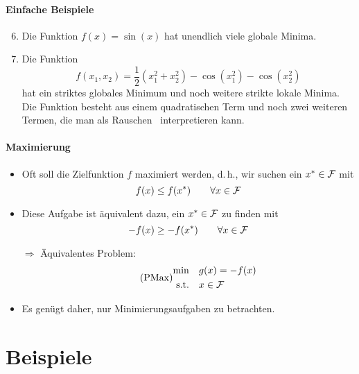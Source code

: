 \paragraph{Einfache Beispiele}

\begin{enumerate}[label=\emph{\alph*})]
	\setcounter{enumi}{5}
	\item Die Funktion $f(x)=\sin(x)$ hat unendlich viele globale Minima.
	\item  Die Funktion
		\begin{equation*}
			f(x_1,x_2)=\frac{1}{2}(x_1^2+x_2^2)-\cos(x_1^2)-\cos(x_2^2)
		\end{equation*}
		hat ein striktes globales Minimum und noch weitere strikte lokale Minima. Die Funktion besteht aus einem quadratischen Term und noch zwei weiteren Termen, die man als \glqq Rauschen\grqq ~ interpretieren kann.
\end{enumerate}

\paragraph{Maximierung}

\begin{itemize}
	\item Oft soll die Zielfunktion $f$ maximiert werden, d.\,h., wir suchen ein $x^\ast \in \mathcal{F}$ mit
	\begin{equation*}
		f(x)\leq f(x^\ast) \qquad \forall x\in\mathcal{F}
	\end{equation*}
	\item Diese Aufgabe ist \"aquivalent dazu, ein $x^\ast\in\mathcal{F}$ zu finden mit
	\begin{equation*}
		-f(x)\geq -f(x^\ast)\qquad \forall x\in\mathcal{F}
	\end{equation*}
	\item[$\Rightarrow$] Äquivalentes Problem:
	\begin{gather}
	\label{eq:PMax}   
	\tag{PMax}
	\begin{aligned}
	\min 
	& & & g(x)=-f(x)\\
	\text{s.t.}
	& & & x\in\mathcal{F}
	\end{aligned}
	\end{gather}
	\item  Es gen\"ugt daher, nur Minimierungsaufgaben zu betrachten.
\end{itemize}
	
\section{Beispiele}
